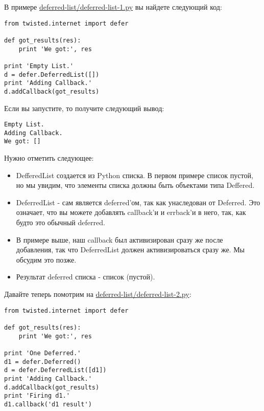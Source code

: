 В примере \href{http://github.com/jdavisp3/twisted-intro/blob/master/deferred-list/deferred-list-1.py#L1}{deferred-list/deferred-list-1.py} вы найдете следующий код:

 \begin{verbatim}
from twisted.internet import defer

def got_results(res):
    print 'We got:', res

print 'Empty List.'
d = defer.DeferredList([])
print 'Adding Callback.'
d.addCallback(got_results)
\end{verbatim} 

Если вы запустите, то получите следующий вывод:

 \begin{verbatim}
Empty List.
Adding Callback.
We got: []
\end{verbatim} 

Нужно отметить следующее:

\begin{itemize}

\item DefferedList создается из Python списка. В первом примере список 
    пустой, но мы увидим, что элементы списка должны быть объектами 
    типа Deffered.

\item DeferredList - сам является deferred'ом, так как унаследован от Deferred. Это означает, 
    что вы можете добавлять callback'и и errback'и в него, так, как будто 
    это обычный deferred.

\item В примере выше, наш callback был активизирован сразу же 
    после добавления, так что DeferredList должен активизироваться 
    сразу же. Мы обсудим это позже.

\item Результат deferred списка - список (пустой). 

\end{itemize}

Давайте теперь помотрим на 
\href{http://github.com/jdavisp3/twisted-intro/blob/master/deferred-list/deferred-list-2.py#L1}{deferred-list/deferred-list-2.py}:

 \begin{verbatim}
from twisted.internet import defer

def got_results(res):
    print 'We got:', res

print 'One Deferred.'
d1 = defer.Deferred()
d = defer.DeferredList([d1])
print 'Adding Callback.'
d.addCallback(got_results)
print 'Firing d1.'
d1.callback('d1 result')
\end{verbatim} 


